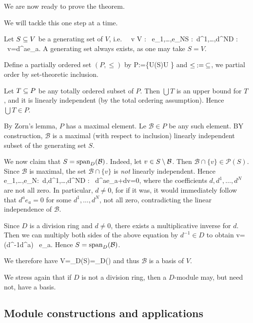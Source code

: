 We are now ready to prove the theorem.

 We will tackle this one step at a time.
\ben[label=\alph*)]

\item Let $S\subseteq V$ be a generating set of $V$, i.e.\
\bse
\forall \, v \in V : \exists \, e_1,\ldots,e_N\in S : \exists \,d^1,\ldots,d^N\in D : \ v=d^ae_a. 
\ese
A generating set always exists, as one may take $S=V$.

\item Define a partially ordered set $(P,\leq)$ by
\bse
P:=\{U\in {}(S)\mid U \}
\ese
and $\leq\medspace :=\medspace \subseteq$, we partial order by set-theoretic inclusion.
\item Let $T\subseteq P$ be any totally ordered subset of $P$. Then $\bigcup T$ is an upper bound for $T$, and it is linearly independent (by the total ordering assumption). Hence $\bigcup T \in P$.

By Zorn's lemma, $P$ has a maximal element. Le $\mathcal{B}\in P$ be any such element. BY construction, $\mathcal{B}$ is a maximal (with respect to inclusion) linearly independent subset of the generating set $S$.

\item We now claim that $S=\operatorname{span}_D(\mathcal{B})$. Indeed, let $v\in S\setminus\mathcal{B}$. Then $\mathcal{B}\cap \{v\}\in \mathcal{P}(S)$. Since $\mathcal{B}$ is maximal, the set $\mathcal{B}\cap \{v\}$ is \emph{not} linearly independent. Hence
\bse
\exists\, e_1,\ldots,e_N\in{}:\exists\, d,d^1,\ldots,d^N\in D : \ d^ae_a+dv=0,
\ese
where the coefficients $d,d^1,\ldots,d^N$ are not all zero. In particular, $d\neq 0$, for if it was, it would immediately follow that $d^ae_a=0$ for some $d^1,\ldots,d^N$, not all zero, contradicting the linear independence of $\mathcal{B}$.

Since $D$ is a division ring and $d\neq 0$, there exists a multiplicative inverse for $d$. Then we can multiply both sides of the above equation by $d^{-1}\in D$ to obtain
\bse
v= (d^{-1}\cdot d^a) \, e_a.
\ese
Hence $S=\operatorname{span}_D(\mathcal{B})$.
\item We therefore have
\bse
V=\lspan_D(S)=\lspan_D()
\ese
and thus $\mathcal{B}$ is a basis of $V$. \qedhere
\een
\eq

We stress again that if $D$ is not a division ring, then a $D$-module may, but need not, have a basis.

\subsection{Module constructions and applications}

